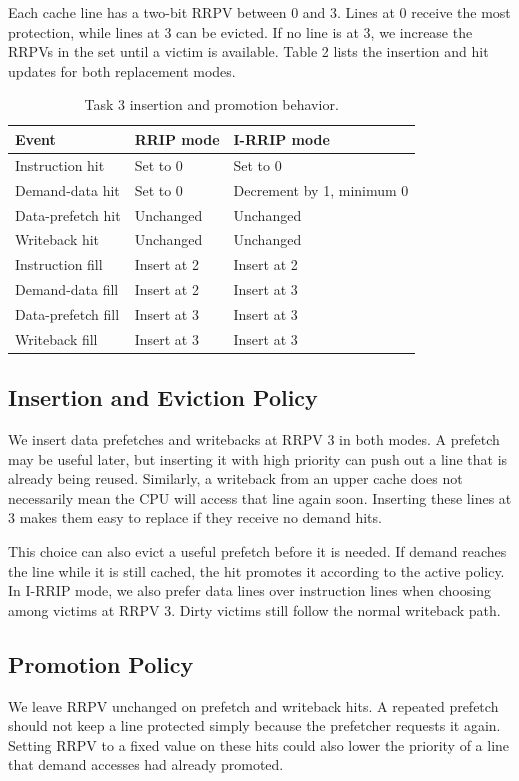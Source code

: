 \documentclass[11pt,a4paper]{article}
\begin{document}
Each cache line has a two-bit RRPV between 0 and 3. Lines at 0 receive
the most protection, while lines at 3 can be evicted. If no line is at 3,
we increase the RRPVs in the set until a victim is available.
Table 2 lists the insertion and hit updates for both replacement modes.

\begin{table}[H]
\centering\small
\caption{Task 3 insertion and promotion behavior.}
\begin{tabularx}{\linewidth}{lXX}
\toprule
Event & RRIP mode & I-RRIP mode \\
\midrule
Instruction hit & Set to 0 & Set to 0 \\
Demand-data hit & Set to 0 & Decrement by 1, minimum 0 \\
Data-prefetch hit & Unchanged & Unchanged \\
Writeback hit & Unchanged & Unchanged \\
Instruction fill & Insert at 2 & Insert at 2 \\
Demand-data fill & Insert at 2 & Insert at 3 \\
Data-prefetch fill & Insert at 3 & Insert at 3 \\
Writeback fill & Insert at 3 & Insert at 3 \\
\bottomrule
\end{tabularx}
\end{table}

\subsection{Insertion and Eviction Policy}
We insert data prefetches and writebacks at RRPV 3 in both modes.
A prefetch may be useful later, but inserting it with high priority can
push out a line that is already being reused. Similarly, a writeback from
an upper cache does not necessarily mean the CPU will access that line
again soon. Inserting these lines at 3 makes them easy to replace if they
receive no demand hits.

This choice can also evict a useful prefetch before it is needed. If demand
reaches the line while it is still cached, the hit promotes it according
to the active policy. In I-RRIP mode, we also prefer data lines over
instruction lines when choosing among victims at RRPV 3. Dirty victims
still follow the normal writeback path.

\subsection{Promotion Policy}
We leave RRPV unchanged on prefetch and writeback hits. A repeated
prefetch should not keep a line protected simply because the prefetcher
requests it again. Setting RRPV to a fixed value on these hits could also
lower the priority of a line that demand accesses had already promoted.
\end{document}
